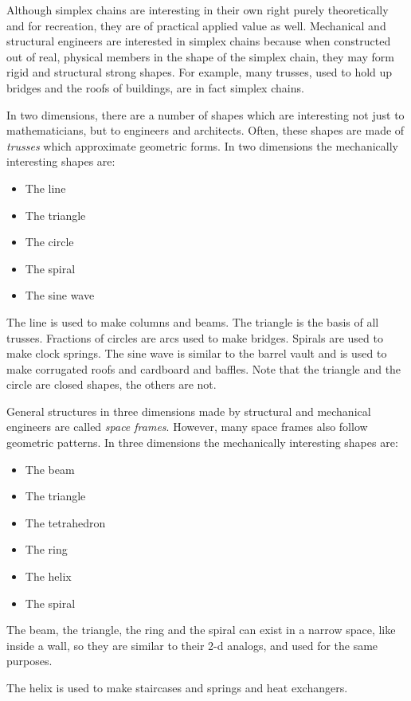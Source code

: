 \documentclass[11pt]{article}
\begin{document}
Although simplex chains are interesting in their own right purely theoretically and for recreation,
they are of practical applied value as well.
Mechanical and structural engineers are interested in simplex chains because when constructed out of real, physical
members in the shape of the simplex chain, they may form rigid and structural strong shapes.
For example, many trusses, used to hold up bridges and the roofs of buildings, are in fact simplex chains.

In two dimensions, there are a number of shapes which are interesting not just to mathematicians, but
to engineers and architects. Often, these shapes are made of {\em trusses} which approximate
geometric forms.
In two dimensions the mechanically interesting shapes are:
\begin{itemize}
\item The line
\item The triangle
\item The circle
\item The spiral
\item The sine wave
\end{itemize}

The line is used to make columns and beams. The triangle is the basis of all trusses.
Fractions of circles are arcs used to make bridges. Spirals are used to make clock springs.
The sine wave is similar to the barrel vault and is used to make corrugated roofs and cardboard
and baffles.
Note that the triangle and the circle are closed shapes, the others are not.

General structures in three dimensions made by structural and mechanical engineers are
called {\em space frames}. However, many space frames also follow geometric patterns.
In three dimensions the mechanically interesting shapes are:
\begin{itemize}
\item The beam
\item The triangle
\item The tetrahedron
\item The ring
\item The helix
\item The spiral
\end{itemize}

The beam, the triangle, the ring and the spiral can exist in a narrow space, like inside a wall,
so they are similar to their 2-d analogs, and used for the same purposes.

The helix is used to make staircases and springs and heat exchangers.
\end{document}
